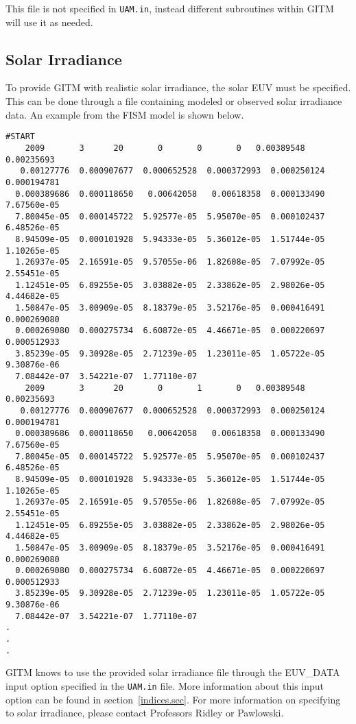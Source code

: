 This file is not specified in {\tt UAM.in}, instead different subroutines within GITM will use it as needed.

\subsection{Solar Irradiance}
\label{solar_irradiance.sec}

To provide GITM with realistic solar irradiance, the solar EUV must be specified.  This can be done through a file containing modeled or observed solar irradiance data.  An example from the FISM model is shown below.

\begin{verbatim}
#START
    2009       3      20       0       0       0   0.00389548   0.00235693
   0.00127776  0.000907677  0.000652528  0.000372993  0.000250124  0.000194781
  0.000389686  0.000118650   0.00642058   0.00618358  0.000133490  7.67560e-05
  7.80045e-05  0.000145722  5.92577e-05  5.95070e-05  0.000102437  6.48526e-05
  8.94509e-05  0.000101928  5.94333e-05  5.36012e-05  1.51744e-05  1.10265e-05
  1.26937e-05  2.16591e-05  9.57055e-06  1.82608e-05  7.07992e-05  2.55451e-05
  1.12451e-05  6.89255e-05  3.03882e-05  2.33862e-05  2.98026e-05  4.44682e-05
  1.50847e-05  3.00909e-05  8.18379e-05  3.52176e-05  0.000416491  0.000269080
  0.000269080  0.000275734  6.60872e-05  4.46671e-05  0.000220697  0.000512933
  3.85239e-05  9.30928e-05  2.71239e-05  1.23011e-05  1.05722e-05  9.30876e-06
  7.08442e-07  3.54221e-07  1.77110e-07
    2009       3      20       0       1       0   0.00389548   0.00235693
   0.00127776  0.000907677  0.000652528  0.000372993  0.000250124  0.000194781
  0.000389686  0.000118650   0.00642058   0.00618358  0.000133490  7.67560e-05
  7.80045e-05  0.000145722  5.92577e-05  5.95070e-05  0.000102437  6.48526e-05
  8.94509e-05  0.000101928  5.94333e-05  5.36012e-05  1.51744e-05  1.10265e-05
  1.26937e-05  2.16591e-05  9.57055e-06  1.82608e-05  7.07992e-05  2.55451e-05
  1.12451e-05  6.89255e-05  3.03882e-05  2.33862e-05  2.98026e-05  4.44682e-05
  1.50847e-05  3.00909e-05  8.18379e-05  3.52176e-05  0.000416491  0.000269080
  0.000269080  0.000275734  6.60872e-05  4.46671e-05  0.000220697  0.000512933
  3.85239e-05  9.30928e-05  2.71239e-05  1.23011e-05  1.05722e-05  9.30876e-06
  7.08442e-07  3.54221e-07  1.77110e-07
.
.
.
\end{verbatim}

GITM knows to use the provided solar irradiance file through the EUV\_DATA input option specified in the {\tt UAM.in} file.  More information about this input option can be found in section~\ref{indices.sec}.  For more information on specifying to solar irradiance, please contact Professors Ridley or Pawlowski.

